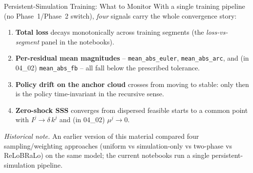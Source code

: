 \documentclass[aspectratio=169,11pt]{beamer}
\newcommand{\emphc}[1]{\textcolor{harvardcrimson}{#1}}
\begin{document}
\begin{frame}{Persistent-Simulation Training: What to Monitor}
With a single training pipeline (no Phase~1/Phase~2 switch), \emph{four} signals carry the whole convergence story:

\vspace{0.3em}
\begin{enumerate}\itemsep3pt
    \item \textbf{Total loss} decays monotonically across training segments (the \emph{loss-vs-segment} panel in the notebooks).
    \item \textbf{Per-residual mean magnitudes} -- \texttt{mean\_abs\_euler}, \texttt{mean\_abs\_arc}, and (in 04\_02) \texttt{mean\_abs\_fb} -- all fall below the prescribed tolerance.
    \item \textbf{Policy drift on the anchor cloud} crosses from \emphc{moving} to \emphc{stable}: only then is the policy time-invariant in the recursive sense.
    \item \textbf{Zero-shock SSS} converges from dispersed feasible starts to a common point with $I^j \to \delta\,k^j$ and (in 04\_02) $\mu^j \to 0$.
\end{enumerate}

\vspace{0.4em}
{\footnotesize \emph{Historical note.}  An earlier version of this material compared four sampling/weighting approaches (uniform vs simulation-only vs two-phase vs ReLoBRaLo) on the same model; the current notebooks run a single persistent-simulation pipeline.}
\end{frame}
\end{document}
